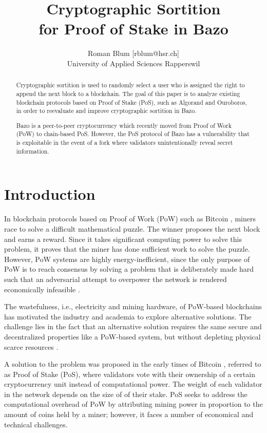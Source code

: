 \documentclass[12pt,a4]{article}
\begin{document}
\title{Cryptographic Sortition \\for Proof of Stake in Bazo}
\author{Roman Blum [rblum@hsr.ch]\\
        University of Applied Sciences Rapperswil}
\maketitle

\begin{abstract}
Cryptographic sortition is used to randomly select a user who is assigned the right to append the next block to a blockchain. 
The goal of this paper is to analyze existing blockchain protocols based on Proof of Stake (PoS), such as Algorand and Ouroboros, in order to reevaluate and improve cryptographic sortition in Bazo.  

Bazo is a peer-to-peer cryptocurrency which recently moved from Proof of Work (PoW) to chain-based PoS. However, the PoS protocol of Bazo has a vulnerability that is exploitable in the event of a fork where validators unintentionally reveal secret information.
\end{abstract}

\section{Introduction}

In blockchain protocols based on Proof of Work (PoW) such as Bitcoin \cite{Nakamoto08}, miners race to solve a difficult mathematical puzzle. The winner proposes the next block and earns a reward. Since it takes significant computing power to solve this problem, it proves that the miner has done sufficient work to solve the puzzle. However, PoW systems are highly energy-inefficient, since the only purpose of PoW is to reach consensus by solving a problem that is deliberately made hard such that an adversarial attempt to overpower the network is rendered economically infeasible \cite{MajorityAttack}.

The wastefulness, i.e., electricity and mining hardware, of PoW-based blockchains has motivated the industry and academia to explore alternative solutions. The challenge lies in the fact that an alternative solution requires the same secure and decentralized properties like a PoW-based system, but without depleting physical scarce resources \cite{Bentov14}.

A solution to the problem was proposed in the early times of Bitcoin \cite{QuantumMechanic11}, referred to as Proof of Stake (PoS), where validators vote with their ownership of a certain cryptocurrency unit instead of computational power. The weight of each validator in the network depends on the size of of their stake. PoS seeks to address the computational overhead of PoW by attributing mining power in proportion to the amount of coins held by a miner; however, it faces a number of economical and technical challenges. 
\end{document}
